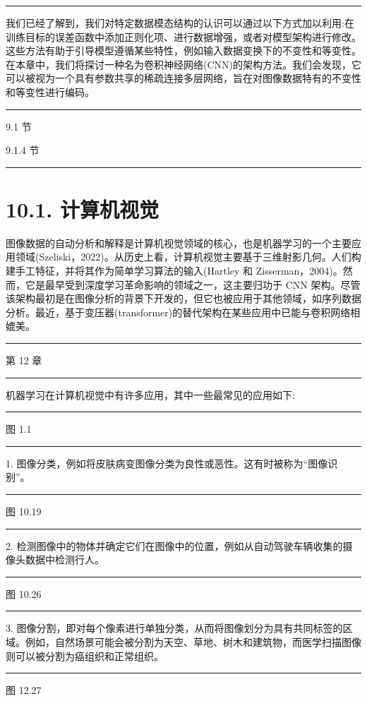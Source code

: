 \documentclass[10pt]{article}
\newcommand{\HRule}{\begin{center}\rule{0.9\linewidth}{0.2mm}\end{center}}
\begin{document}
\HRule

我们已经了解到，我们对特定数据模态结构的认识可以通过以下方式加以利用:在训练目标的误差函数中添加正则化项、进行数据增强，或者对模型架构进行修改。这些方法有助于引导模型遵循某些特性，例如输入数据变换下的不变性和等变性。在本章中，我们将探讨一种名为卷积神经网络(CNN)的架构方法。我们会发现，它可以被视为一个具有参数共享的稀疏连接多层网络，旨在对图像数据特有的不变性和等变性进行编码。

\HRule

9.1 节

9.1.4 节

\HRule

\section*{10.1. 计算机视觉}

图像数据的自动分析和解释是计算机视觉领域的核心，也是机器学习的一个主要应用领域(Szeliski，2022)。从历史上看，计算机视觉主要基于三维射影几何。人们构建手工特征，并将其作为简单学习算法的输入(Hartley 和 Zisserman，2004)。然而，它是最早受到深度学习革命影响的领域之一，这主要归功于 CNN 架构。尽管该架构最初是在图像分析的背景下开发的，但它也被应用于其他领域，如序列数据分析。最近，基于变压器(transformer)的替代架构在某些应用中已能与卷积网络相媲美。

\HRule

第 12 章

\HRule

机器学习在计算机视觉中有许多应用，其中一些最常见的应用如下:

\HRule

图 1.1

\HRule

1. 图像分类，例如将皮肤病变图像分类为良性或恶性。这有时被称为“图像识别”。

\HRule

图 10.19

\HRule

2. 检测图像中的物体并确定它们在图像中的位置，例如从自动驾驶车辆收集的摄像头数据中检测行人。

\HRule

图 10.26

\HRule

3. 图像分割，即对每个像素进行单独分类，从而将图像划分为具有共同标签的区域。例如，自然场景可能会被分割为天空、草地、树木和建筑物，而医学扫描图像则可以被分割为癌组织和正常组织。

\HRule

图 12.27
\end{document}
